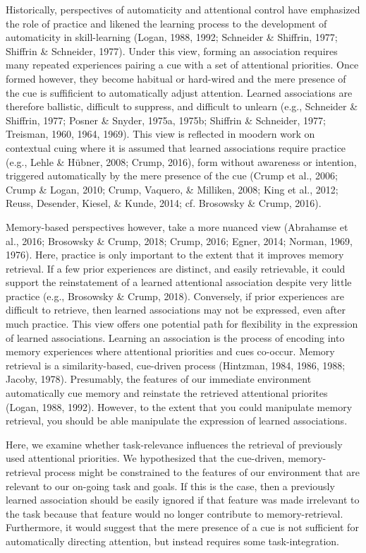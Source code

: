 \documentclass[english,,man,floatsintext]{apa6}
\begin{document}
Historically, perspectives of automaticity and attentional control have emphasized the role of practice and likened the learning process to the development of automaticity in skill-learning (Logan, 1988, 1992; Schneider \& Shiffrin, 1977; Shiffrin \& Schneider, 1977). Under this view, forming an association requires many repeated experiences pairing a cue with a set of attentional priorities. Once formed however, they become habitual or hard-wired and the mere presence of the cue is suffificient to automatically adjust attention. Learned associations are therefore ballistic, difficult to suppress, and difficult to unlearn (e.g., Schneider \& Shiffrin, 1977; Posner \& Snyder, 1975a, 1975b; Shiffrin \& Schneider, 1977; Treisman, 1960, 1964, 1969). This view is reflected in moodern work on contextual cuing where it is assumed that learned associations require practice (e.g., Lehle \& Hübner, 2008; Crump, 2016), form without awareness or intention, triggered automatically by the mere presence of the cue (Crump et al., 2006; Crump \& Logan, 2010; Crump, Vaquero, \& Milliken, 2008; King et al., 2012; Reuss, Desender, Kiesel, \& Kunde, 2014; cf. Brosowsky \& Crump, 2016).

Memory-based perspectives however, take a more nuanced view (Abrahamse et al., 2016; Brosowsky \& Crump, 2018; Crump, 2016; Egner, 2014; Norman, 1969, 1976). Here, practice is only important to the extent that it improves memory retrieval. If a few prior experiences are distinct, and easily retrievable, it could support the reinstatement of a learned attentional association despite very little practice (e.g., Brosowsky \& Crump, 2018). Conversely, if prior experiences are difficult to retrieve, then learned associations may not be expressed, even after much practice. This view offers one potential path for flexibility in the expression of learned associations. Learning an association is the process of encoding into memory experiences where attentional priorities and cues co-occur. Memory retrieval is a similarity-based, cue-driven process (Hintzman, 1984, 1986, 1988; Jacoby, 1978). Presumably, the features of our immediate environment automatically cue memory and reinstate the retrieved attentional priorites (Logan, 1988, 1992). However, to the extent that you could manipulate memory retrieval, you should be able manipulate the expression of learned associations.

Here, we examine whether task-relevance influences the retrieval of previously used attentional priorities. We hypothesized that the cue-driven, memory-retrieval process might be constrained to the features of our environment that are relevant to our on-going task and goals. If this is the case, then a previously learned association should be easily ignored if that feature was made irrelevant to the task because that feature would no longer contribute to memory-retrieval. Furthermore, it would suggest that the mere presence of a cue is not sufficient for automatically directing attention, but instead requires some task-integration.
\end{document}
